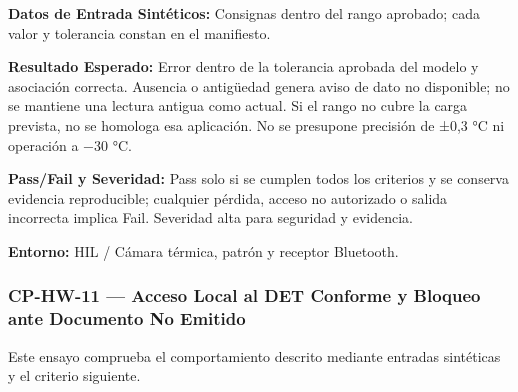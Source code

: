 \par\noindent\textbf{Datos de Entrada Sintéticos:} Consignas dentro del rango aprobado; cada valor y tolerancia constan en el manifiesto.\par
\par\noindent\textbf{Resultado Esperado:} Error dentro de la tolerancia aprobada del modelo y asociación correcta. Ausencia o antigüedad genera aviso de dato no disponible; no se mantiene una lectura antigua como actual. Si el rango no cubre la carga prevista, no se homologa esa aplicación. No se presupone precisión de ±0,3 °C ni operación a −30 °C.\par
\par\noindent\textbf{Pass/Fail y Severidad:} Pass solo si se cumplen todos los criterios y se conserva evidencia reproducible; cualquier pérdida, acceso no autorizado o salida incorrecta implica Fail. Severidad alta para seguridad y evidencia.\par
\par\noindent\textbf{Entorno:} HIL / Cámara térmica, patrón y receptor Bluetooth.\par


\subsubsection*{CP-HW-11 — Acceso Local al DET Conforme y Bloqueo ante Documento No Emitido}\label{sec:9-cp-hw-11}
Este ensayo comprueba el comportamiento descrito mediante entradas sintéticas y el criterio siguiente.

